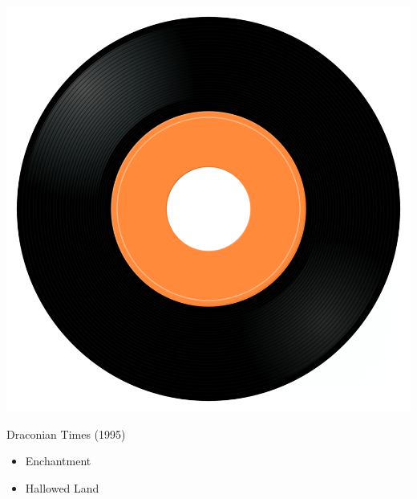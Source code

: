\begin{minipage}[t]{0.25\textwidth}
\captionsetup{type=figure}
\includegraphics[width=\textwidth]{Images/cover.png}
\caption*{Draconian Times (1995)}
\end{minipage}
\begin{minipage}[t]{0.25\textwidth}\vspace{0pt}
\begin{itemize}[nosep,leftmargin=1em,labelwidth=*,align=left]
	\setlength{\itemsep}{0pt}
	\item Enchantment
	\item Hallowed Land
\end{itemize}
\end{minipage}
